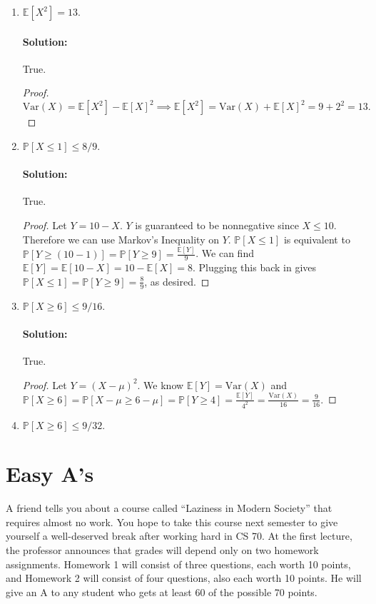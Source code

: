 \documentclass[11pt, notitlepage]{article}
\newcommand{\E}{\mathbb{E}}
\newcommand{\mP}{\mathbb{P}}
\newcommand{\var}[1]{\text{Var}(#1)}
\newcommand{\Question}[1]{\newpage\section{#1}}
\newenvironment{solution}{\paragraph{Solution:}}{\hfill \vspace{10mm}}
\begin{document}
\begin{enumerate}[label=\alph*.)]
\item $\E[X^2] = 13$.\label{markov-chebyshev-part-a}
\begin{solution} True.
\begin{proof}
		$\var{X}=\E[X^2]-\E[X]^2\implies \E[X^2]=\var{X}+\E[X]^2=9+2^2=13.$

\end{proof}
\end{solution}
\item $\mP[X \leq 1] \leq 8/9$.
\begin{solution} True.
	\begin{proof}
	Let $Y = 10 - X$. $Y$ is guaranteed to be nonnegative since $X\leq 10$. Therefore we can use Markov's Inequality on $Y$. $\mP[X\leq 1]$ is equivalent to $\mP[Y\geq (10-1)]=\mP[Y\geq 9]=\frac{\E[Y]}{9}$. We can find $\E[Y]=\E[10-X]=10-\E[X]=8$. Plugging this back in gives $\mP[X\leq 1]=\mP[Y\geq 9]=\frac{8}{9}$, as desired.
\end{proof}

\end{solution}
\item $\mP[X \geq 6] \leq 9/16$.
\begin{solution} True.
\begin{proof}
	Let $Y = (X-\mu)^2$. We know $\E[Y]=\var{X}$ and $\mP[X\geq 6]=\mP[X-\mu\geq 6-\mu]=\mP[Y\geq 4]=\frac{\E[Y]}{4^2}=\frac{\var{X}}{16}=\frac{9}{16}.$
\end{proof}
\end{solution}
\item $\mP[X \geq 6] \leq 9/32$.
\end{enumerate}




\Question{Easy A's}

A friend tells you about a course called ``Laziness in Modern Society'' that requires almost no work. You hope to take this course next semester to give yourself a well-deserved break after working hard in CS 70. At the first lecture, the professor announces that grades will depend only on two homework assignments. Homework 1 will consist of three questions, each worth 10 points, and Homework 2 will consist of four questions, also each worth 10 points. He will give an A to any student who gets at least 60 of the possible 70 points.
\end{document}
